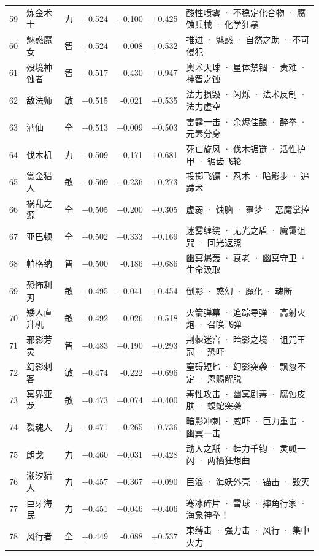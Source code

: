 \documentclass[10pt,a4paper]{article}
\begin{document}
{\begin{longtable}{@{}rlcrrrp{7.6cm}@{}}
59 & 炼金术士 & 力 & +0.524 & +0.100 & +0.425 & \small 酸性喷雾 · 不稳定化合物 · 腐蚀兵械 · 化学狂暴 \\
60 & 魅惑魔女 & 智 & +0.524 & -0.008 & +0.532 & \small 推进 · 魅惑 · 自然之助 · 不可侵犯 \\
61 & 殁境神蚀者 & 智 & +0.517 & -0.430 & +0.947 & \small 奥术天球 · 星体禁锢 · 责难 · 神智之蚀 \\
62 & 敌法师 & 敏 & +0.515 & -0.021 & +0.535 & \small 法力损毁 · 闪烁 · 法术反制 · 法力虚空 \\
63 & 酒仙 & 全 & +0.513 & +0.009 & +0.503 & \small 雷霆一击 · 余烬佳酿 · 醉拳 · 元素分身 \\
64 & 伐木机 & 力 & +0.509 & -0.171 & +0.681 & \small 死亡旋风 · 伐木锯链 · 活性护甲 · 锯齿飞轮 \\
65 & 赏金猎人 & 敏 & +0.509 & +0.236 & +0.273 & \small 投掷飞镖 · 忍术 · 暗影步 · 追踪术 \\
66 & 祸乱之源 & 全 & +0.505 & +0.200 & +0.305 & \small 虚弱 · 蚀脑 · 噩梦 · 恶魔掌控 \\
67 & 亚巴顿 & 全 & +0.502 & +0.333 & +0.169 & \small 迷雾缠绕 · 无光之盾 · 魔霭诅咒 · 回光返照 \\
68 & 帕格纳 & 智 & +0.500 & -0.186 & +0.686 & \small 幽冥爆轰 · 衰老 · 幽冥守卫 · 生命汲取 \\
69 & 恐怖利刃 & 敏 & +0.495 & +0.041 & +0.454 & \small 倒影 · 惑幻 · 魔化 · 魂断 \\
70 & 矮人直升机 & 敏 & +0.492 & -0.026 & +0.518 & \small 火箭弹幕 · 追踪导弹 · 高射火炮 · 召唤飞弹 \\
71 & 邪影芳灵 & 智 & +0.483 & +0.190 & +0.293 & \small 荆棘迷宫 · 暗影之境 · 诅咒王冠 · 恐吓 \\
72 & 幻影刺客 & 敏 & +0.474 & -0.222 & +0.696 & \small 窒碍短匕 · 幻影突袭 · 飘忽不定 · 恩赐解脱 \\
73 & 冥界亚龙 & 敏 & +0.473 & +0.074 & +0.400 & \small 毒性攻击 · 幽冥剧毒 · 腐蚀皮肤 · 蝮蛇突袭 \\
74 & 裂魂人 & 力 & +0.471 & -0.265 & +0.736 & \small 暗影冲刺 · 威吓 · 巨力重击 · 幽冥一击 \\
75 & 朗戈 & 力 & +0.460 & +0.031 & +0.428 & \small 动人之舐 · 蛙力千钧 · 灵呱一闪 · 两栖狂想曲 \\
76 & 潮汐猎人 & 力 & +0.457 & +0.367 & +0.090 & \small 巨浪 · 海妖外壳 · 锚击 · 毁灭 \\
77 & 巨牙海民 & 力 & +0.451 & +0.046 & +0.406 & \small 寒冰碎片 · 雪球 · 摔角行家 · 海象神拳！ \\
78 & 风行者 & 全 & +0.449 & -0.088 & +0.537 & \small 束缚击 · 强力击 · 风行 · 集中火力 \\

\end{longtable}}
\end{document}
